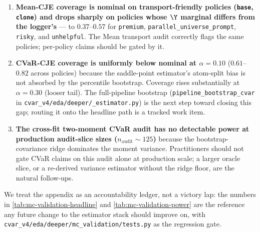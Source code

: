 \begin{enumerate}[leftmargin=*,nosep]
  \item \textbf{Mean-CJE coverage is nominal on transport-friendly policies
    (\texttt{base}, \texttt{clone}) and drops sharply on policies whose
    $\Y$ marginal differs from the logger's} — to $0.37$--$0.57$ for
    \texttt{premium}, \texttt{parallel\_universe\_prompt},
    \texttt{risky}, and \texttt{unhelpful}. The Mean transport audit
    correctly flags the same policies; per-policy claims should be gated
    by it.
  \item \textbf{CVaR-CJE coverage is uniformly below nominal at
    $\alpha{=}0.10$} ($0.61$--$0.82$ across policies) because the
    saddle-point estimator's atom-split bias is not absorbed by the
    percentile bootstrap. Coverage rises substantially at $\alpha{=}0.30$
    (looser tail). The full-pipeline bootstrap
    (\texttt{pipeline\_bootstrap\_cvar} in
    \texttt{cvar\_v4/eda/deeper/\_estimator.py}) is the next step toward
    closing this gap; routing it onto the headline path is a tracked
    work item.
  \item \textbf{The cross-fit two-moment CVaR audit has no detectable
    power at production audit-slice sizes ($n_{\text{audit}}{\sim}125$)}
    because the bootstrap-covariance ridge dominates the moment variance.
    Practitioners should not gate CVaR claims on this audit alone at
    production scale; a larger oracle slice, or a re-derived variance
    estimator without the ridge floor, are the natural follow-ups.
\end{enumerate}

We treat the appendix as an accountability ledger, not a victory lap: the
numbers in \cref{tab:mc-validation-headline} and
\cref{tab:mc-validation-power} are the reference any future change to the
estimator stack should improve on, with \texttt{cvar\_v4/eda/deeper/mc\_validation/tests.py}
as the regression gate.

